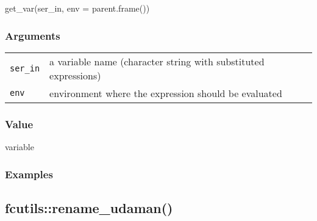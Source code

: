 \documentclass[
  letterpaper,
  DIV=11,
  numbers=noendperiod]{scrreport}
\newenvironment{Shaded}{\begin{snugshade}}{\end{snugshade}}
\newcommand{\AttributeTok}[1]{\textcolor[rgb]{0.40,0.45,0.13}{#1}}
\newcommand{\FunctionTok}[1]{\textcolor[rgb]{0.28,0.35,0.67}{#1}}
\newcommand{\NormalTok}[1]{\textcolor[rgb]{0.00,0.23,0.31}{#1}}
\newcommand{\OtherTok}[1]{\textcolor[rgb]{0.00,0.23,0.31}{#1}}
\newcommand{\SpecialCharTok}[1]{\textcolor[rgb]{0.37,0.37,0.37}{#1}}
\newcommand{\StringTok}[1]{\textcolor[rgb]{0.13,0.47,0.30}{#1}}
\begin{document}
\begin{Shaded}
\begin{Highlighting}[]
\FunctionTok{get\_var}\NormalTok{(ser\_in, }\AttributeTok{env =} \FunctionTok{parent.frame}\NormalTok{())}
\end{Highlighting}
\end{Shaded}

\subsubsection{Arguments}\label{arguments-58}

\begin{longtable}[]{@{}ll@{}}
\toprule\noalign{}
\endhead
\bottomrule\noalign{}
\endlastfoot
\texttt{ser\_in} & a variable name (character string with substituted
expressions) \\
\texttt{env} & environment where the expression should be evaluated \\
\end{longtable}

\subsubsection{Value}\label{value-58}

variable

\subsubsection{Examples}\label{examples-58}

\begin{Shaded}
\end{Shaded}

\subsection{fcutils::rename\_udaman()}\label{fcutilsrename_udaman}
\end{document}

